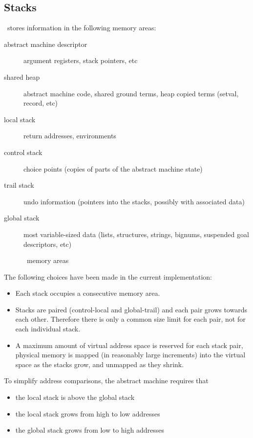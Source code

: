 \subsection{Stacks}
\eclipse\ stores information in the following memory areas:
\begin{description}
\item[abstract machine descriptor] argument registers, stack pointers, etc
\item[shared heap] abstract machine code, shared ground terms,
        heap copied terms (setval, record, etc)
\item[local stack] return addresses, environments
\item[control stack] choice points (copies of parts of the
        abstract machine state)
\item[trail stack] undo information (pointers into the stacks, possibly
        with associated data)
\item[global stack] most variable-sized data (lists, structures,
        strings, bignums, suspended goal descriptors, etc)
\end{description}
\begin{figure}
\caption{\eclipse\ memory areas}
\end{figure}
The following choices have been made in the current implementation:
\begin{itemize}
\item Each stack occupies a consecutive memory area.
\item Stacks are paired (control-local and global-trail) and each pair
        grows towards each other.
        Therefore there is only a common size limit for each pair,
        not for each individual stack.
\item A maximum amount of virtual address space is reserved for each
        stack pair, physical memory is mapped (in reasonably large increments)
        into the virtual space as the stacks grow, and unmapped as they
        shrink.
\end{itemize}
To simplify address comparisons, the abstract machine requires that
\begin{itemize}
\item the local stack is above the global stack
\item the local stack grows from high to low addresses
\item the global stack grows from low to high addresses
\end{itemize}



